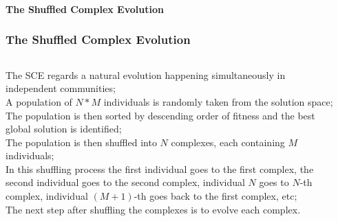 
%
\begin{frame}
\frametitle{}
\begin{center}
  \textbf{\Large The Shuffled Complex Evolution}
\end{center}
\end{frame}

%
\begin{frame}
\frametitle{The Shuffled Complex Evolution}
\begin{columns}
\begin{column}{0.75\textwidth}  %
  {\small
  The SCE  regards a natural  evolution happening
  simultaneously in independent communities;
  \\ \medskip \pause
  A population of $N*M$ individuals is randomly taken from the
  solution space;
  \\ \medskip \pause
  The population is then sorted by descending order of fitness
  and the best global solution is identified;
  \\ \medskip \pause
  The population is then shuffled into $N$ complexes,
  each containing $M$ individuals;
  \\ \medskip \pause
  In this shuffling process the first individual goes to the first complex, the second
  individual goes to the second complex, individual $N$ goes to $N$-th complex,
  individual $(M+1)$-th goes back to the first complex, etc;
  \\ \medskip \pause
  The next step after shuffling the complexes is to evolve each complex.
  }
\end{column} \pause
\begin{column}{0.25\textwidth}

\end{column}
\end{columns}
\end{frame}
